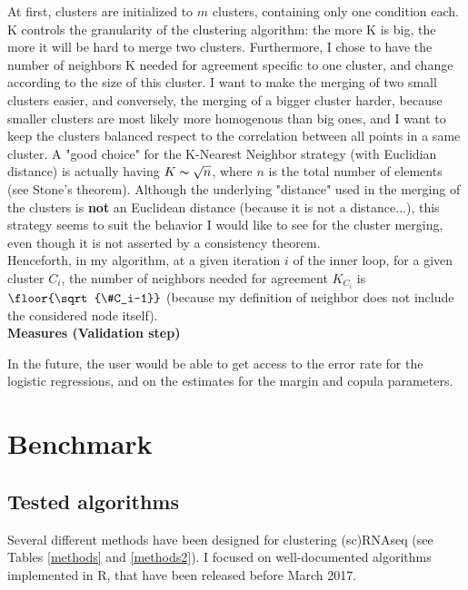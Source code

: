 \documentclass{report}
\begin{document}
{At first, clusters are initialized to $m$ clusters, containing only one condition each.\\

K controls the granularity of the clustering algorithm: the more K is big, the more it will be hard to merge two clusters. Furthermore, I chose to have the number of neighbors K needed for agreement specific to one cluster, and change according to the size of this cluster. I want to make the merging of two small clusters easier, and conversely, the merging of a bigger cluster harder, because smaller clusters are most likely more homogenous than big ones, and I want to keep the clusters balanced respect to the correlation between all points in a same cluster. A "good choice" for the K-Nearest Neighbor strategy (with Euclidian distance) is actually having $K \thicksim \sqrt{n}$, where $n$ is the total number of elements (see Stone's theorem\cite{stone1977consistent}). Although the underlying "distance" used in the merging of the clusters is \textbf{not} an Euclidean distance (because it is not a distance...), this strategy seems to suit the behavior I would like to see for the cluster merging, even though it is not asserted by a consistency theorem.\\

Henceforth, in my algorithm, at a given iteration $i$ of the inner loop, for a given cluster $C_i$, the number of neighbors needed for agreement $K_{C_i}$ is $\floor{\sqrt{\#C_i-1}}$ (because my definition of neighbor does not include the considered node itself).\\

\bigskip
\noindent \textbf{Measures (Validation step)}
\bigskip

In the future, the user would be able to get access to the error rate for the logistic regressions, and on the estimates for the margin and copula parameters.

\chapter{Benchmark}

\section*{Tested algorithms}

Several different methods have been designed for clustering (sc)RNAseq (see Tables \ref{methods} and \ref{methods2}). I focused on well-documented algorithms implemented in R, that have been released before March 2017.

}
\end{document}
